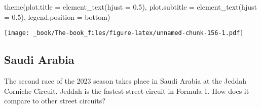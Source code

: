 \documentclass[
]{book}
\newenvironment{Shaded}{\begin{snugshade}}{\end{snugshade}}
\newcommand{\AttributeTok}[1]{\textcolor[rgb]{0.77,0.63,0.00}{#1}}
\newcommand{\FloatTok}[1]{\textcolor[rgb]{0.00,0.00,0.81}{#1}}
\newcommand{\FunctionTok}[1]{\textcolor[rgb]{0.00,0.00,0.00}{#1}}
\newcommand{\NormalTok}[1]{#1}
\newcommand{\StringTok}[1]{\textcolor[rgb]{0.31,0.60,0.02}{#1}}
\begin{document}
\begin{Shaded}
\begin{Highlighting}[]
  \FunctionTok{theme}\NormalTok{(}\AttributeTok{plot.title =} \FunctionTok{element\_text}\NormalTok{(}\AttributeTok{hjust =} \FloatTok{0.5}\NormalTok{),}
        \AttributeTok{plot.subtitle =} \FunctionTok{element\_text}\NormalTok{(}\AttributeTok{hjust =} \FloatTok{0.5}\NormalTok{),}
        \AttributeTok{legend.position =} \StringTok{\textquotesingle{}bottom\textquotesingle{}}\NormalTok{)}
\end{Highlighting}
\end{Shaded}

\texttt{[image: \_book/The-book\_files/figure-latex/unnamed-chunk-156-1.pdf]}

\hypertarget{saudi-arabia}{%
\subsection{Saudi Arabia}\label{saudi-arabia}}

The second race of the 2023 season takes place in Saudi Arabia at the Jeddah Corniche Circuit. Jeddah is the fastest street circuit in Formula 1. How does it compare to other street circuits?
\end{document}
